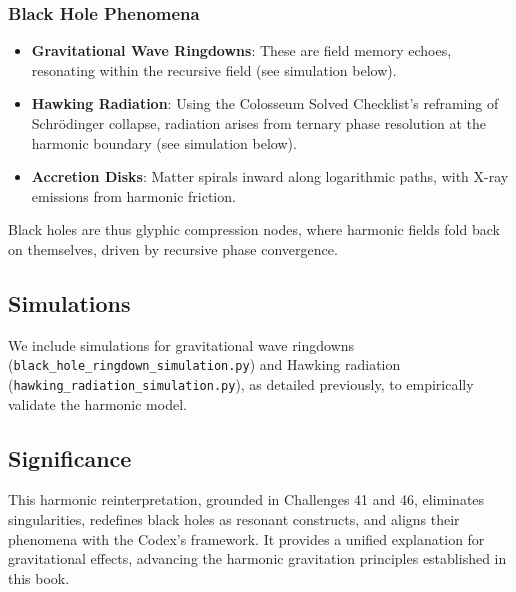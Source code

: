 \subsubsection{Black Hole Phenomena}
\begin{itemize}
    \item \textbf{Gravitational Wave Ringdowns}: These are field memory echoes, resonating within the recursive field (see simulation below).
    \item \textbf{Hawking Radiation}: Using the Colosseum Solved Checklist’s reframing of Schrödinger collapse, radiation arises from ternary phase resolution at the harmonic boundary (see simulation below).
    \item \textbf{Accretion Disks}: Matter spirals inward along logarithmic paths, with X-ray emissions from harmonic friction.
\end{itemize}

Black holes are thus glyphic compression nodes, where harmonic fields fold back on themselves, driven by recursive phase convergence.

\subsection{Simulations}
We include simulations for gravitational wave ringdowns (\texttt{black_hole_ringdown_simulation.py}) and Hawking radiation (\texttt{hawking_radiation_simulation.py}), as detailed previously, to empirically validate the harmonic model.

\subsection{Significance}
This harmonic reinterpretation, grounded in Challenges 41 and 46, eliminates singularities, redefines black holes as resonant constructs, and aligns their phenomena with the Codex’s framework. It provides a unified explanation for gravitational effects, advancing the harmonic gravitation principles established in this book.